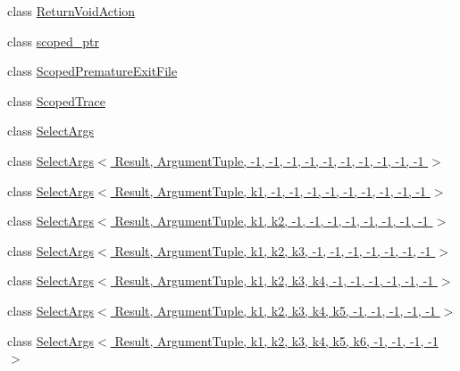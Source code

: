 \begin{DoxyCompactItemize}
class \hyperlink{classtesting_1_1internal_1_1ReturnVoidAction}{Return\+Void\+Action}
\item 
class \hyperlink{classtesting_1_1internal_1_1scoped__ptr}{scoped\+\_\+ptr}
\item 
class \hyperlink{classtesting_1_1internal_1_1ScopedPrematureExitFile}{Scoped\+Premature\+Exit\+File}
\item 
class \hyperlink{classtesting_1_1internal_1_1ScopedTrace}{Scoped\+Trace}
\item 
class \hyperlink{classtesting_1_1internal_1_1SelectArgs}{Select\+Args}
\item 
class \hyperlink{classtesting_1_1internal_1_1SelectArgs_3_01Result_00_01ArgumentTuple_00_01-1_00_01-1_00_01-1_00_d26521468f85209f6b4c61eca65baf5d}{Select\+Args$<$ Result, Argument\+Tuple, -\/1, -\/1, -\/1, -\/1, -\/1, -\/1, -\/1, -\/1, -\/1, -\/1 $>$}
\item 
class \hyperlink{classtesting_1_1internal_1_1SelectArgs_3_01Result_00_01ArgumentTuple_00_01k1_00_01-1_00_01-1_00_6a5fc7802a60cf36c89bd10623cc9552}{Select\+Args$<$ Result, Argument\+Tuple, k1, -\/1, -\/1, -\/1, -\/1, -\/1, -\/1, -\/1, -\/1, -\/1 $>$}
\item 
class \hyperlink{classtesting_1_1internal_1_1SelectArgs_3_01Result_00_01ArgumentTuple_00_01k1_00_01k2_00_01-1_00_9a332764141890440172b7f06e77bbee}{Select\+Args$<$ Result, Argument\+Tuple, k1, k2, -\/1, -\/1, -\/1, -\/1, -\/1, -\/1, -\/1, -\/1 $>$}
\item 
class \hyperlink{classtesting_1_1internal_1_1SelectArgs_3_01Result_00_01ArgumentTuple_00_01k1_00_01k2_00_01k3_00_4b8877f94cb457a4d2bd6b2630090309}{Select\+Args$<$ Result, Argument\+Tuple, k1, k2, k3, -\/1, -\/1, -\/1, -\/1, -\/1, -\/1, -\/1 $>$}
\item 
class \hyperlink{classtesting_1_1internal_1_1SelectArgs_3_01Result_00_01ArgumentTuple_00_01k1_00_01k2_00_01k3_00_030eb2335b9fd029fe61511c21b4d364}{Select\+Args$<$ Result, Argument\+Tuple, k1, k2, k3, k4, -\/1, -\/1, -\/1, -\/1, -\/1, -\/1 $>$}
\item 
class \hyperlink{classtesting_1_1internal_1_1SelectArgs_3_01Result_00_01ArgumentTuple_00_01k1_00_01k2_00_01k3_00_dabb861d0dfd59e876e4adc8d7e61c25}{Select\+Args$<$ Result, Argument\+Tuple, k1, k2, k3, k4, k5, -\/1, -\/1, -\/1, -\/1, -\/1 $>$}
\item 
class \hyperlink{classtesting_1_1internal_1_1SelectArgs_3_01Result_00_01ArgumentTuple_00_01k1_00_01k2_00_01k3_00_bb7097ad0bebc299c171ea7e2f7fc9a0}{Select\+Args$<$ Result, Argument\+Tuple, k1, k2, k3, k4, k5, k6, -\/1, -\/1, -\/1, -\/1 $>$}

\end{DoxyCompactItemize}
